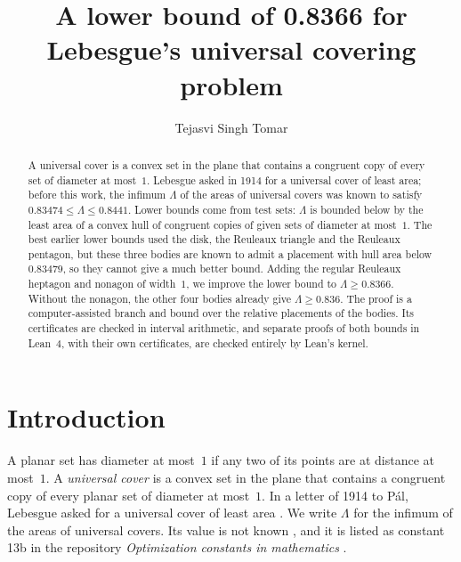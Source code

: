 \documentclass[11pt]{amsart}
\theoremstyle{definition}
\theoremstyle{remark}
\numberwithin{equation}{section}
\newcommand{\LBFOUR}{0.836}
\newcommand{\LBMAIN}{0.8366}
\begin{document}
\title[Lebesgue's universal covering problem]{A lower bound of \LBMAIN{} for Lebesgue's universal covering problem}
\author{Tejasvi Singh Tomar}
\renewcommand{\urladdrname}{{\itshape ORCID}}

\begin{abstract}
A universal cover is a convex set in the plane that contains a congruent copy of every set of diameter at most~$1$. Lebesgue asked in 1914 for a universal cover of least area; before this work, the infimum $\Lambda$ of the areas of universal covers was known to satisfy $0.83474\le\Lambda\le0.8441$. Lower bounds come from test sets: $\Lambda$ is bounded below by the least area of a convex hull of congruent copies of given sets of diameter at most~$1$. The best earlier lower bounds used the disk, the Reuleaux triangle and the Reuleaux pentagon, but these three bodies are known to admit a placement with hull area below $0.83479$, so they cannot give a much better bound. Adding the regular Reuleaux heptagon and nonagon of width~$1$, we improve the lower bound to $\Lambda\ge\LBMAIN$. Without the nonagon, the other four bodies already give $\Lambda\ge\LBFOUR$. The proof is a computer-assisted branch and bound over the relative placements of the bodies. Its certificates are checked in interval arithmetic, and separate proofs of both bounds in Lean~4, with their own certificates, are checked entirely by Lean's kernel.
\end{abstract}

\maketitle

\section{Introduction}\label{sec:intro}

A planar set has diameter at most~$1$ if any two of its points are at distance at most~$1$. A \emph{universal cover} is a convex set in the plane that contains a congruent copy of every planar set of diameter at most~$1$. In a letter of 1914 to Pál, Lebesgue asked for a universal cover of least area \cite{Pal20}. We write $\Lambda$ for the infimum of the areas of universal covers. Its value is not known \cite{BMP05}, and it is listed as constant 13b in the repository \emph{Optimization constants in mathematics} \cite{Tao26}.
\end{document}
